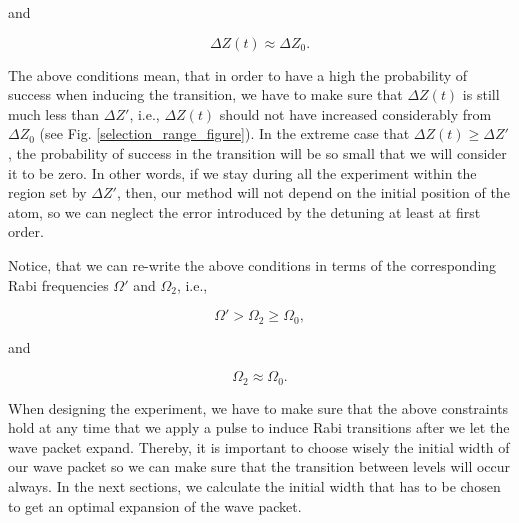 \documentclass{article}
\begin{document}
and 

\begin{equation}\label{condition_transition_width2}
    \Delta Z(t) \approx \Delta Z_{0}.
\end{equation}

The above conditions mean, that in order to have a high the probability of success when inducing the transition, we have to make sure that $\Delta Z(t)$ is still much less than $\Delta Z'$, i.e.,  $\Delta Z(t)$ should not have increased considerably from $\Delta Z_{0}$ (see Fig. \ref{selection_range_figure}). In the extreme case that $\Delta Z(t) \ge \Delta Z'$, the probability of success in the transition will be so small that we will consider it to be zero. In other words, if we stay during all the experiment within the region set by $\Delta Z'$, then, our method will not depend on the initial position of the atom, so we can neglect the error introduced by the detuning at least at first order.

Notice, that we can re-write the above conditions in terms of the corresponding Rabi frequencies $\Omega'$ and $\Omega_{2}$, i.e.,

\begin{equation}
    \Omega' > \Omega_{2} \ge \Omega_{0},
\end{equation}

and

\begin{equation}
    \Omega_{2} \approx \Omega_{0}.
\end{equation}
    
When designing the experiment, we have to make sure that the above constraints hold at any time that we apply a pulse to induce Rabi transitions after we let the wave packet expand. Thereby, it is important to choose wisely the initial width of our wave packet so we can make sure that the transition between levels will occur always. In the next sections, we calculate the initial width that has to be chosen to get an optimal expansion of the wave packet.
\end{document}
